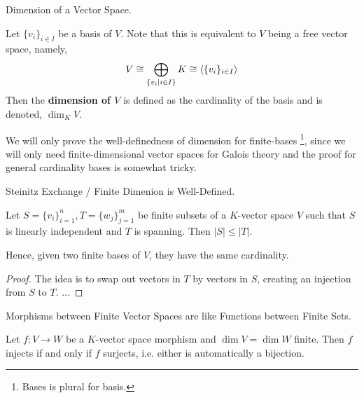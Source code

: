 \documentclass[../book.tex]{subfiles}
\begin{document}
\begin{dfn} Dimension of a Vector Space.

    Let $\{v_i\}_{i\in I}$ be a basis of $V$. 
    Note that this is equivalent to $V$ being a free vector space, namely, 
    \[
        V \cong \bigoplus_{\{v_i \mid i\in I\}} K \cong \langle\{v_i\}_{i\in I}\rangle 
    \]
    Then the \textbf{dimension of $V$} is defined as the cardinality of the basis
    and is denoted, $\dim_K V$. 
    
    We will only prove the well-definedness of dimension for finite-bases
    \footnote{Bases is plural for basis.}, 
    since we will only need finite-dimensional vector spaces for Galois theory
    and the proof for general cardinality bases is somewhat tricky. 
\end{dfn}
\begin{lem} Steinitz Exchange / Finite Dimenion is Well-Defined. 

    Let $S = \{v_i\}_{i=1}^n, T = \{w_j\}_{j=1}^m$ be finite subsets 
    of a $K$-vector space $V$ such that 
    $S$ is linearly independent and $T$ is spanning. 
    Then $|S| \leq |T|$.
    
    Hence, given two finite bases of $V$, they have the same cardinality. 
\end{lem}
\begin{proof}
    The idea is to swap out vectors in $T$ by vectors in $S$, 
    creating an injection from $S$ to $T$. 
    ...
\end{proof}
\begin{cor} Morphisms between Finite Vector Spaces 
are like Functions between Finite Sets. 

    Let $f : V \to W$ be a $K$-vector space morphism and $\dim V = \dim W$ finite.
    Then $f$ injects if and only if $f$ surjects, i.e.
    either is automatically a bijection. 
\end{cor}
\end{document}
